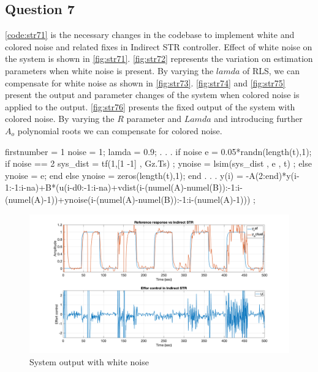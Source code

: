 \FloatBarrier
\subsection{Question 7}
\autoref{code:str71}  is the necessary changes in the codebase to implement white and colored noise and related fixes in Indirect STR controller.  Effect of white noise on the system is shown in \autoref{fig:str71}.  \autoref{fig:str72} represents the variation on estimation parameters when white noise is present. By varying the $lamda$ of RLS, we can compensate for white noise as shown in  \autoref{fig:str73}.  \autoref{fig:str74} and  \autoref{fig:str75} present the output and parameter changes of the system when colored noise is applied to the output.  \autoref{fig:str76} presents the fixed output of the system with colored noise. By varying the $R$ parameter and $Lamda$ and introducing further $A_o$ polynomial roots we can compensate for colored noise.

\begin{code}
	\begin{matlabcode}{firstnumber = 1}
noise = 1; %
lamda = 0.9;
. . .
if noise
	e = 0.05*randn(length(t),1);
	if noise == 2
		sys_dist = tf(1,[1 -1] , Gz.Ts) ;
		ynoise = lsim(sys_dist , e , t) ;
	else
		ynoise = e;
	end
else
	ynoise = zeros(length(t),1);
end
. . .
    y(i) = -A(2:end)*y(i-1:-1:i-na)+B*(u(i-d0:-1:i-na)+vdist(i-(numel(A)-numel(B)):-1:i-(numel(A)-1))+ynoise(i-(numel(A)-numel(B)):-1:i-(numel(A)-1))) ;

	\end{matlabcode}
	\label{code:str71}
\end{code}

\begin{figure}
	\centering
	\includegraphics[width=\textwidth]{images/str71.png}
	\caption{System output with white noise}
	\label{fig:str71}
\end{figure}

